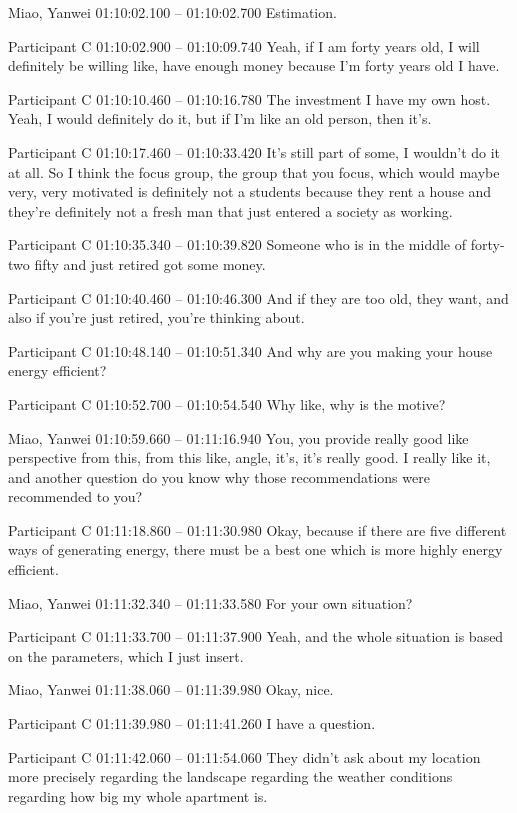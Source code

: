 {Miao, Yanwei 01:10:02.100 -- 01:10:02.700
Estimation.

Participant C 01:10:02.900 -- 01:10:09.740
Yeah, if I am forty years old, I will definitely be willing like, have enough money because I'm forty years old I have.

Participant C 01:10:10.460 -- 01:10:16.780
The investment I have my own host. Yeah, I would definitely do it, but if I'm like an old person, then it's.

Participant C 01:10:17.460 -- 01:10:33.420
It's still part of some, I wouldn't do it at all. So I think the focus group, the group that you focus, which would maybe very, very motivated is definitely not a students because they rent a house and they're definitely not a fresh man that just entered a society as working.

Participant C 01:10:35.340 -- 01:10:39.820
Someone who is in the middle of forty- two fifty and just retired got some money.

Participant C 01:10:40.460 -- 01:10:46.300
And if they are too old, they want, and also if you're just retired, you're thinking about.

Participant C 01:10:48.140 -- 01:10:51.340
And why are you making your house energy efficient?

Participant C 01:10:52.700 -- 01:10:54.540
Why like, why is the motive?

Miao, Yanwei 01:10:59.660 -- 01:11:16.940
You, you provide really good like perspective from this, from this like, angle, it's, it's really good. I really like it, and another question do you know why those recommendations were recommended to you?

Participant C 01:11:18.860 -- 01:11:30.980
Okay, because if there are five different ways of generating energy, there must be a best one which is more highly energy efficient.

Miao, Yanwei 01:11:32.340 -- 01:11:33.580
For your own situation?

Participant C 01:11:33.700 -- 01:11:37.900
Yeah, and the whole situation is based on the parameters, which I just insert.

Miao, Yanwei 01:11:38.060 -- 01:11:39.980
Okay, nice.

Participant C 01:11:39.980 -- 01:11:41.260
I have a question.

Participant C 01:11:42.060 -- 01:11:54.060
They didn't ask about my location more precisely regarding the landscape regarding the weather conditions regarding how big my whole apartment is.

}
